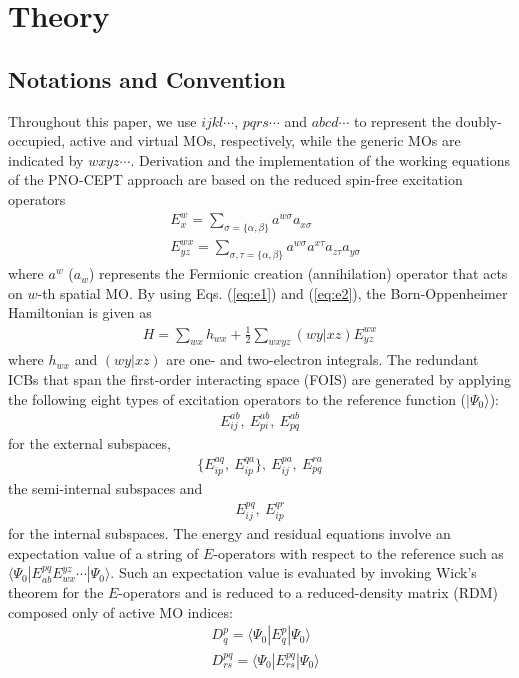 \documentclass[aip,jcp,amsmath,twocolumn,floatfix,reprint,fleqn]{revtex4-1}
\begin{document}
\section{Theory}\label{Sec:theory}

\subsection{Notations and Convention}
%
Throughout this paper, we use $ijkl\cdots$, $pqrs\cdots$ and $abcd\cdots$ to represent the doubly-occupied, active and virtual MOs, respectively, while the generic MOs are indicated by $wxyz\cdots$.
%
Derivation and the implementation of the working equations of the PNO-CEPT approach are based on the reduced spin-free excitation operators
%
\begin{align}
  &E^w_x = \sum_{\sigma=\{\alpha,\beta\}} a^{w\sigma}a_{x\sigma} \label{eq:e1} \\
  &E^{wx}_{yz} = \sum_{\sigma,\tau=\{\alpha,\beta\}} a^{w\sigma}a^{x\tau}a_{z\tau}a_{y\sigma} \label{eq:e2}
\end{align}
%
where $a^{w}$ ($a_w$) represents the Fermionic creation (annihilation) operator that acts on $w$-th spatial MO.
%
By using Eqs. (\ref{eq:e1}) and (\ref{eq:e2}), the Born-Oppenheimer Hamiltonian is given as
\begin{align}
  H=\sum_{wx} h_{wx} + \frac{1}{2}\sum_{wxyz} (wy|xz) E^{wx}_{yz}
\end{align}
%
where $h_{wx}$ and $(wy|xz)$ are one- and two-electron integrals.
%
The redundant ICBs that span the first-order interacting space (FOIS) are generated by applying the following eight types of excitation operators to the reference function ($|\Psi_0\rangle$):
%
\begin{align}
  E_{ij}^{ab},\ E_{pi}^{ab},\ E_{pq}^{ab} \label{eq:externalICB}
\end{align}
%
for the external subspaces,
%
\begin{align}
  \{E_{ip}^{aq},\ E_{ip}^{qa}\},\ E_{ij}^{pa},\ E_{pq}^{ra}
\end{align}
%
the semi-internal subspaces and
%
\begin{align}
  E_{ij}^{pq},\ E_{ip}^{qr}
\end{align}
%
for the internal subspaces.
%
The energy and residual equations involve an expectation value of a string of $E$-operators with respect to the reference such as $\langle\Psi_0|E^{pq}_{ab}E_{wx}^{yz}\cdots|\Psi_0\rangle$.
%
Such an expectation value is evaluated by invoking Wick's theorem for the $E$-operators and is reduced to a reduced-density matrix (RDM) composed only of active MO indices:
%
\begin{align}
  &D^{p}_{q} = \langle\Psi_0|E^{p}_{q}|\Psi_0\rangle  \\
  &D^{pq}_{rs} = \langle\Psi_0|E^{pq}_{rs}|\Psi_0\rangle
\end{align}
\end{document}
